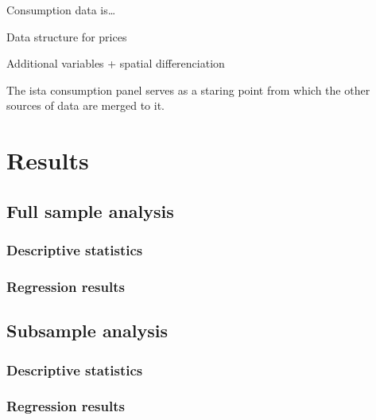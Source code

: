 \documentclass[12pt,twoside]{reedthesis}
\begin{document}
Consumption data is\ldots{}

Data structure for prices

Additional variables + spatial differenciation

The ista consumption panel serves as a staring point from which the other sources of data are merged to it.

\hypertarget{results}{%
\chapter{Results}\label{results}}

\hypertarget{full_results}{%
\section{Full sample analysis}\label{full_results}}

\hypertarget{full_results_descriptive}{%
\subsection{Descriptive statistics}\label{full_results_descriptive}}

\hypertarget{full_results_regression}{%
\subsection{Regression results}\label{full_results_regression}}

\hypertarget{full_results}{%
\section{Subsample analysis}\label{full_results}}

\hypertarget{full_results_descriptive}{%
\subsection{Descriptive statistics}\label{full_results_descriptive}}

\hypertarget{full_results_regression}{%
\subsection{Regression results}\label{full_results_regression}}
\end{document}
